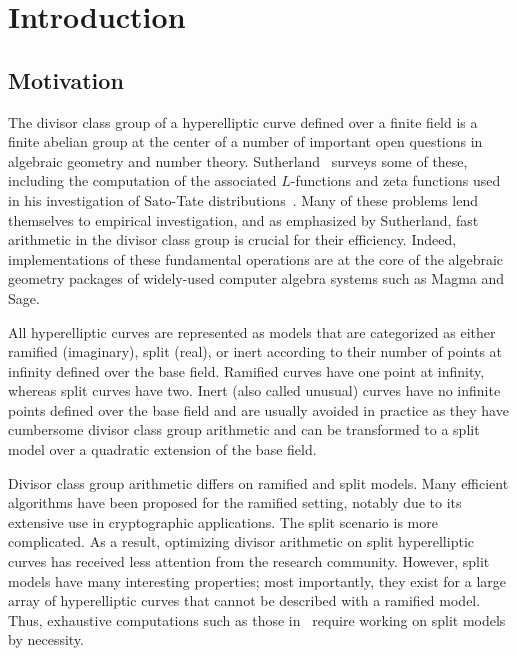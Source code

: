 
\chapter{Introduction}


\section{Motivation}
The divisor class group of a hyperelliptic curve defined over a finite field is
a finite abelian group at the center of a number of important open questions in
algebraic geometry and number theory. Sutherland~\cite{Sutherland_g3_2019}
surveys some of these, including the computation of the associated $L$-functions
and zeta functions used in his investigation of Sato-Tate
distributions~\cite{Sutherland_sato_2016}. Many of these problems lend
themselves to empirical investigation, and as emphasized by Sutherland, fast
arithmetic in the divisor class group is crucial for their efficiency. Indeed,
implementations of these fundamental operations are at the core of the algebraic
geometry packages of widely-used computer algebra systems such as Magma and
Sage.

All hyperelliptic curves are represented as models that are categorized as
either ramified (imaginary), split (real), or inert according to their number of
points at infinity defined over the base field. Ramified curves have one point
at infinity, whereas split curves have two. Inert (also called unusual) curves
have no infinite points defined over the base field and are usually avoided in
practice as they have cumbersome divisor class group arithmetic and can be
transformed to a split model over a quadratic extension of the base field.

Divisor class group arithmetic differs on ramified and split models. Many
efficient algorithms have been proposed for the ramified setting, notably due to
its extensive use in cryptographic applications. The split scenario is more
complicated. As a result, optimizing divisor arithmetic on split hyperelliptic
curves has received less attention from the research community. However, split
models have many interesting properties; most importantly, they exist for a
large array of hyperelliptic curves that cannot be described with a ramified
model. Thus, exhaustive computations such as those
in~\cite{Sutherland_sato_2016} require working on split models by necessity.

